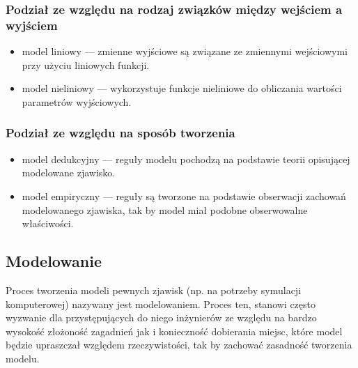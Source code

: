 \subsubsection{Podział ze względu na rodzaj związków między wejściem a wyjściem}
\par{
\begin{itemize}
\item model liniowy --- zmienne wyjściowe są związane ze zmiennymi wejściowymi przy użyciu liniowych funkcji.
\item model nieliniowy --- wykorzystuje funkcje nieliniowe do obliczania wartości parametrów wyjściowych.
\end{itemize}
}

\subsubsection{Podział ze względu na sposób tworzenia}
\par{
\begin{itemize}
\item model dedukcyjny --- reguły modelu pochodzą na podstawie teorii opisującej modelowane zjawisko.
\item model empiryczny --- reguły są tworzone na podstawie obserwacji zachowań modelowanego zjawiska, tak by model miał podobne obserwowalne właściwości.
\end{itemize}
}

\subsection{Modelowanie}
\par{
Proces tworzenia modeli pewnych zjawisk (np. na potrzeby symulacji komputerowej) nazywany jest modelowaniem. Proces ten, stanowi często wyzwanie dla przystępujących do niego inżynierów ze względu na bardzo wysokość złożoność zagadnień jak i konieczność dobierania miejsc, które model będzie upraszczał względem rzeczywistości, tak by zachować zasadność tworzenia modelu.
}

